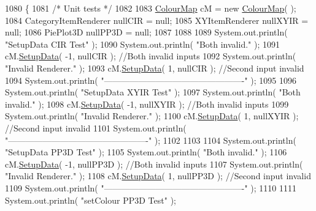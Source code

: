 \begin{DoxyCode}
1080                                              \{
1081         \textcolor{comment}{/* Unit tests */}
1082         
1083         \hyperlink{class_colour_map}{ColourMap} cM = \textcolor{keyword}{new} \hyperlink{class_colour_map_abba281e323f79dc7dc5f31efe4b67852}{ColourMap}(  );
1084         CategoryItemRenderer nullCIR = null;
1085         XYItemRenderer nullXYIR = null;
1086         PiePlot3D nullPP3D = null;
1087         
1088         
1089         System.out.println( \textcolor{stringliteral}{"SetupData CIR Test"} );
1090         System.out.println( \textcolor{stringliteral}{"Both invalid."} );
1091         cM.\hyperlink{class_colour_map_a9f696ea699b7fc471bb2dde6f1d1ce09}{SetupData}( -1, nullCIR ); \textcolor{comment}{//Both invalid inputs}
1092         System.out.println( \textcolor{stringliteral}{"Invalid Renderer."} );
1093         cM.\hyperlink{class_colour_map_a9f696ea699b7fc471bb2dde6f1d1ce09}{SetupData}( 1, nullCIR ); \textcolor{comment}{//Second input invalid}
1094         System.out.println( \textcolor{stringliteral}{"-------------------------------------------------"} );
1095         
1096         System.out.println( \textcolor{stringliteral}{"SetupData XYIR Test"} );
1097         System.out.println( \textcolor{stringliteral}{"Both invalid."} );
1098         cM.\hyperlink{class_colour_map_a9f696ea699b7fc471bb2dde6f1d1ce09}{SetupData}( -1, nullXYIR ); \textcolor{comment}{//Both invalid inputs}
1099         System.out.println( \textcolor{stringliteral}{"Invalid Renderer."} );
1100         cM.\hyperlink{class_colour_map_a9f696ea699b7fc471bb2dde6f1d1ce09}{SetupData}( 1, nullXYIR ); \textcolor{comment}{//Second input invalid}
1101         System.out.println( \textcolor{stringliteral}{"-------------------------------------------------"} );
1102         
1103         
1104         System.out.println( \textcolor{stringliteral}{"SetupData PP3D Test"} );
1105         System.out.println( \textcolor{stringliteral}{"Both invalid."} );
1106         cM.\hyperlink{class_colour_map_a9f696ea699b7fc471bb2dde6f1d1ce09}{SetupData}( -1, nullPP3D ); \textcolor{comment}{//Both invalid inputs}
1107         System.out.println( \textcolor{stringliteral}{"Invalid Renderer."} );
1108         cM.\hyperlink{class_colour_map_a9f696ea699b7fc471bb2dde6f1d1ce09}{SetupData}( 1, nullPP3D ); \textcolor{comment}{//Second input invalid}
1109         System.out.println( \textcolor{stringliteral}{"-------------------------------------------------"} );
1110         
1111         System.out.println( \textcolor{stringliteral}{"setColour PP3D Test"} );

\end{DoxyCode}

